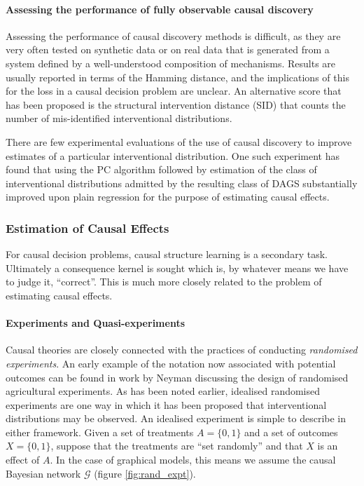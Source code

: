 \paragraph{Assessing the performance of fully observable causal discovery}

Assessing the performance of causal discovery methods is difficult, as they are very often tested on synthetic data or on real data that is generated from a system defined by a well-understood composition of mechanisms\cite{spirtes_causation_1993,ramsey_adjacency-faithfulness_2012,peters_structural_2013,chickering_learning_2002}. Results are usually reported in terms of the Hamming distance, and the implications of this for the loss in a causal decision problem are unclear. An alternative score that has been proposed is the structural intervention distance (SID) that counts the number of mis-identified interventional distributions\cite{peters_structural_2013}.

There are few experimental evaluations of the use of causal discovery to improve estimates of a particular interventional distribution. One such experiment has found that using the PC algorithm followed by estimation of the class of interventional distributions admitted by the resulting class of DAGS substantially improved upon plain regression for the purpose of estimating causal effects\cite{maathuis_predicting_2010}.

\subsubsection{Estimation of Causal Effects}

For causal decision problems, causal structure learning is a secondary task. Ultimately a consequence kernel is sought which is, by whatever means we have to judge it, ``correct''. This is much more closely related to the problem of estimating causal effects.

\paragraph{Experiments and Quasi-experiments}

Causal theories are closely connected with the practices of conducting \emph{randomised experiments}. An early example of the notation now associated with potential outcomes can be found in work by Neyman discussing the design of randomised agricultural experiments\cite{splawa-neyman_application_1990}. As has been noted earlier, idealised randomised experiments are one way in which it has been proposed that interventional distributions may be observed\cite{pearl_causality:_2009}. An idealised experiment is simple to describe in either framework. Given a set of treatments $A=\{0,1\}$ and a set of outcomes $X=\{0,1\}$, suppose that the treatments are ``set randomly'' and that $X$ is an effect of $A$. In the case of graphical models, this means we assume the causal Bayesian network $\mathcal{G}$ (figure \ref{fig:rand_expt}).

